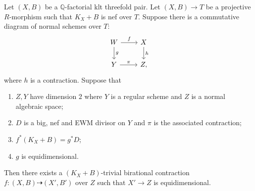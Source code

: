 	\begin{proposition}\label{three}
		Let $(X,B)$ be a $\mathbb{Q}$-factorial klt threefold pair.
		Let $(X,B) \to T$ be a projective $R$-morphism such that $K_{X}+B$ is nef over $T$. Suppose there is a commutative diagram of normal schemes over $T$:
		\[\begin{tikzcd}
		W \arrow[d, "g"] \arrow[r, "f"] & X \arrow[d, "h"]  \\
		Y     \arrow[r, "\pi"]           & Z,              
		\end{tikzcd}\]
		where $h$ is a contraction. Suppose  that 
		\begin{enumerate}
			\item  $Z,Y$ have dimension $2$ where $Y$ is a regular scheme and $Z$ is a normal algebraic space;
			\item $D$ is a big, nef and EWM divisor on $Y$ and $\pi$ is the associated contraction;
			\item  $f^{*}(K_{X}+B)=g^{*}D$;
			\item $g$ is equidimensional. 
		\end{enumerate} 
		
		Then there exists a $(K_X+B)$-trivial birational contraction $f \colon (X,B) \dashrightarrow (X', B')$ over $Z$ such that $X' \to Z$ is equidimensional. 
	\end{proposition}
